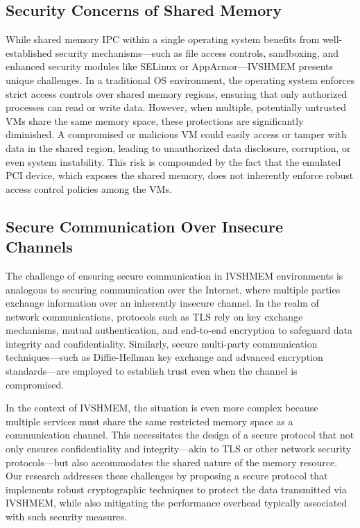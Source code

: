 \documentclass[letterpaper,twocolumn,10pt]{article}
\begin{document}
\subsection{Security Concerns of Shared Memory}
While shared memory IPC within a single operating system benefits from well-established security mechanisms—such as file access controls, sandboxing, and enhanced security modules like SELinux or AppArmor—IVSHMEM presents unique challenges. In a traditional OS environment, the operating system enforces strict access controls over shared memory regions, ensuring that only authorized processes can read or write data. However, when multiple, potentially untrusted VMs share the same memory space, these protections are significantly diminished. A compromised or malicious VM could easily access or tamper with data in the shared region, leading to unauthorized data disclosure, corruption, or even system instability. This risk is compounded by the fact that the emulated PCI device, which exposes the shared memory, does not inherently enforce robust access control policies among the VMs.


\subsection{Secure Communication Over Insecure Channels}

The challenge of ensuring secure communication in IVSHMEM environments is analogous to securing communication over the Internet, where multiple parties exchange information over an inherently insecure channel. In the realm of network communications, protocols such as TLS rely on key exchange mechanisms, mutual authentication, and end-to-end encryption to safeguard data integrity and confidentiality. Similarly, secure multi-party communication techniques—such as Diffie-Hellman key exchange and advanced encryption standards—are employed to establish trust even when the channel is compromised.

In the context of IVSHMEM, the situation is even more complex because multiple services must share the same restricted memory space as a communication channel. This necessitates the design of a secure protocol that not only ensures confidentiality and integrity—akin to TLS or other network security protocols—but also accommodates the shared nature of the memory resource. Our research addresses these challenges by proposing a secure protocol that implements robust cryptographic techniques to protect the data transmitted via IVSHMEM, while also mitigating the performance overhead typically associated with such security measures.
\end{document}
